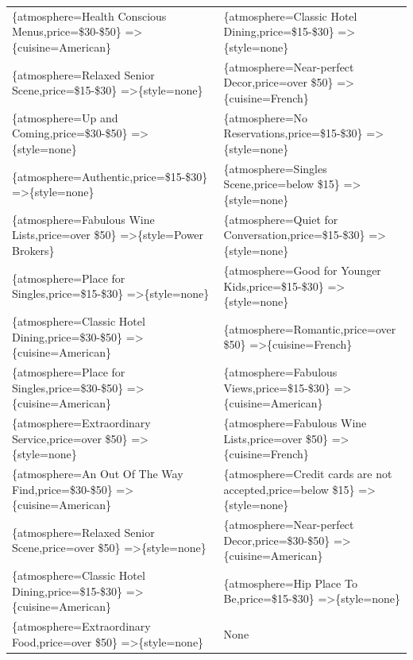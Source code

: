 \documentclass[letterpaper,10pt]{article}
\begin{document}
\begin{appendices}
\begin{table}[h]
\begin{adjustbox}{max width=\textwidth}
\begin{tabular}{ll}
\{atmosphere=Health Conscious Menus,price=\$30-\$50\} =\textgreater \{cuisine=American\} & \{atmosphere=Classic Hotel Dining,price=\$15-\$30\} =\textgreater \{style=none\} \\ 
\{atmosphere=Relaxed Senior Scene,price=\$15-\$30\} =\textgreater \{style=none\} & \{atmosphere=Near-perfect Decor,price=over \$50\} =\textgreater \{cuisine=French\} \\ 
\{atmosphere=Up and Coming,price=\$30-\$50\} =\textgreater \{style=none\} & \{atmosphere=No Reservations,price=\$15-\$30\} =\textgreater \{style=none\} \\ 
\{atmosphere=Authentic,price=\$15-\$30\} =\textgreater \{style=none\} & \{atmosphere=Singles Scene,price=below \$15\} =\textgreater \{style=none\} \\ 
\{atmosphere=Fabulous Wine Lists,price=over \$50\} =\textgreater \{style=Power Brokers\} & \{atmosphere=Quiet for Conversation,price=\$15-\$30\} =\textgreater \{style=none\} \\ 
\{atmosphere=Place for Singles,price=\$15-\$30\} =\textgreater \{style=none\} & \{atmosphere=Good for Younger Kids,price=\$15-\$30\} =\textgreater \{style=none\} \\ 
\{atmosphere=Classic Hotel Dining,price=\$30-\$50\} =\textgreater \{cuisine=American\} & \{atmosphere=Romantic,price=over \$50\} =\textgreater \{cuisine=French\} \\ 
\{atmosphere=Place for Singles,price=\$30-\$50\} =\textgreater \{cuisine=American\} & \{atmosphere=Fabulous Views,price=\$15-\$30\} =\textgreater \{cuisine=American\} \\ 
\{atmosphere=Extraordinary Service,price=over \$50\} =\textgreater \{style=none\} & \{atmosphere=Fabulous Wine Lists,price=over \$50\} =\textgreater \{cuisine=French\} \\ 
\{atmosphere=An Out Of The Way Find,price=\$30-\$50\} =\textgreater \{cuisine=American\} & \{atmosphere=Credit cards are not accepted,price=below \$15\} =\textgreater \{style=none\} \\ 
\{atmosphere=Relaxed Senior Scene,price=over \$50\} =\textgreater \{style=none\} & \{atmosphere=Near-perfect Decor,price=\$30-\$50\} =\textgreater \{cuisine=American\} \\ 
\{atmosphere=Classic Hotel Dining,price=\$15-\$30\} =\textgreater \{cuisine=American\} & \{atmosphere=Hip Place To Be,price=\$15-\$30\} =\textgreater \{style=none\} \\ 
\{atmosphere=Extraordinary Food,price=over \$50\} =\textgreater \{style=none\} & None \\ 

\end{tabular}
\end{adjustbox}
\end{table}
\end{appendices}
\end{document}
